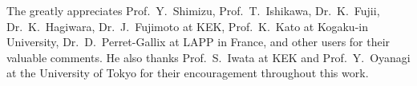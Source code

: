 \vskip 1.0cm
\par\medskip
The greatly appreciates Prof.~Y.~Shimizu, Prof.~T.~Ishikawa,
Dr.~K.~Fujii, Dr.~K.~Hagiwara, Dr.~J.~Fujimoto at KEK,
Prof.~K.~Kato at Kogaku-in University, Dr.~D.~Perret-Gallix at LAPP in
France, and other users for their valuable comments.
He also thanks Prof.~S.~Iwata at KEK and Prof.~Y.~Oyanagi at
the University of Tokyo for their encouragement throughout this work.